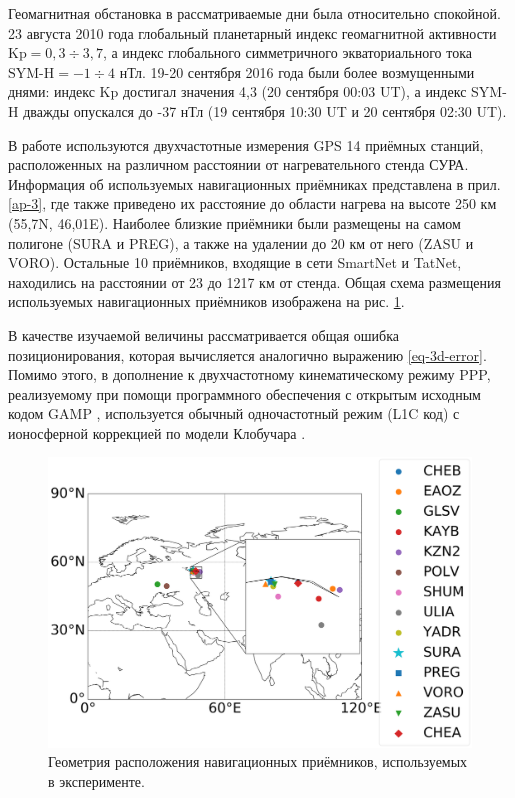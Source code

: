 Геомагнитная обстановка в рассматриваемые дни была относительно спокойной.
23 августа 2010 года глобальный планетарный индекс геомагнитной активности $\text{Kp}=0,3\div3,7$, а индекс глобального симметричного экваториального тока $\text{SYM-H}=-1\div4$ нТл.
19-20 сентября 2016 года были более возмущенными днями: индекс Kp достигал значения 4,3 (20 сентября 00:03 UT), а индекс SYM-H дважды опускался до -37 нТл (19 сентября 10:30 UT и 20 сентября 02:30 UT).

В работе используются двухчастотные измерения GPS 14 приёмных станций, расположенных на различном расстоянии от нагревательного стенда СУРА.
Информация об используемых навигационных приёмниках представлена в прил. \ref{ap-3}, где также приведено их расстояние до области нагрева на высоте 250 км (55,7\degree N, 46,01\degree E).
Наиболее близкие приёмники были размещены на самом полигоне (SURA и PREG), а также на удалении до 20 км от него (ZASU и VORO).
Остальные 10 приёмников, входящие в сети SmartNet и TatNet, находились на расстоянии от 23 до 1217 км от стенда.  
Общая схема размещения используемых навигационных приёмников изображена на рис. \ref{fig-sites}.

В качестве изучаемой величины рассматривается общая ошибка позиционирования, которая вычисляется аналогично выражению \eqref{eq-3d-error}.
Помимо этого, в дополнение к двухчастотному кинематическому режиму PPP, реализуемому при помощи программного обеспечения с открытым исходным кодом GAMP \cite{Zhou2018}, используется обычный одночастотный режим (L1C код) с ионосферной коррекцией по модели Клобучара \cite{Klobuchar1987}. 
\begin{figure}[h]
\centering    
\includegraphics[width=0.7\linewidth]{fig/sites.png}    
\caption{Геометрия расположения навигационных приёмников, используемых в эксперименте.}
\label{fig-sites}      
\end{figure}  